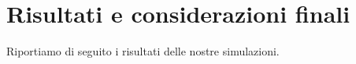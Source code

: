 \section{Risultati e considerazioni finali}
Riportiamo di seguito i risultati delle nostre simulazioni.
%
%
%

